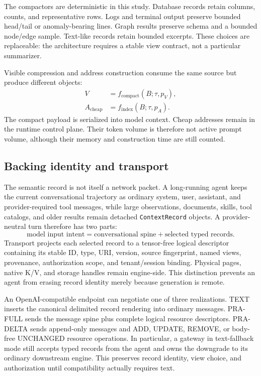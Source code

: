 \documentclass[11pt]{article}
\begin{document}
The compactors are deterministic in this study. Database records retain
columns, counts, and representative rows. Logs and terminal output preserve
bounded head/tail or anomaly-bearing lines. Graph results preserve schema and a
bounded node/edge sample. Text-like records retain bounded excerpts. These
choices are replaceable: the architecture requires a stable view contract, not
a particular summarizer.

Visible compression and address construction consume the same source but
produce different objects:
\begin{align}
V &= f_{\mathrm{compact}}(B;\tau,p_V),\\
A_{\mathrm{cheap}} &= f_{\mathrm{index}}(B;\tau,p_A).
\end{align}
The compact payload is serialized into model context. Cheap addresses remain
in the runtime control plane. Their token volume is therefore not active
prompt volume, although their memory and construction time are still counted.

\subsection{Backing identity and transport}

The semantic record is not itself a network packet. A long-running agent keeps
the current conversational trajectory as ordinary system, user, assistant,
and provider-required tool messages, while large observations, documents,
skills, tool catalogs, and older results remain detached
\texttt{ContextRecord} objects. A provider-neutral turn therefore has two
parts:
\[
\text{model input intent}=\text{conversational spine}+\text{selected typed records}.
\]
Transport projects each selected record to a tensor-free logical descriptor
containing its stable ID, type, URI, version, source fingerprint, named views,
provenance, authorization scope, and tenant/session binding. Physical pages,
native K/V, and storage handles remain engine-side. This distinction prevents
an agent from erasing record identity merely because generation is remote.

An OpenAI-compatible endpoint can negotiate one of three realizations. TEXT
inserts the canonical delimited record rendering into ordinary messages.
PRA-FULL sends the message spine plus complete logical resource descriptors.
PRA-DELTA sends append-only messages and ADD, UPDATE, REMOVE, or body-free
UNCHANGED resource operations. In particular, a gateway in text-fallback mode
still accepts typed records from the agent and owns the downgrade to its
ordinary downstream engine. This preserves record identity, view choice, and
authorization until compatibility actually requires text.
\end{document}
